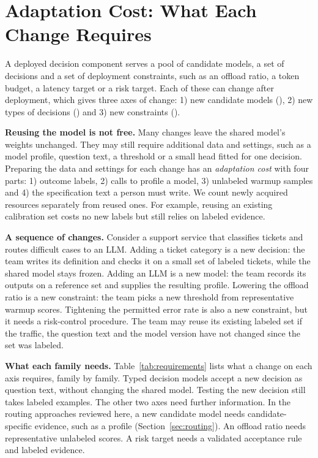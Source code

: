 \section{Adaptation Cost: What Each Change Requires}
\label{sec:adaptation}

A deployed decision component serves a pool of candidate models, a set of decisions and a set of deployment constraints, such as an offload ratio, a token budget, a latency target or a risk target. Each of these can change after deployment, which gives three axes of change: 1) new candidate models (\axisM), 2) new types of decisions (\axisD) and 3) new constraints (\axisC).

\noindent\textbf{Reusing the model is not free.} Many changes leave the shared model's weights unchanged. They may still require additional data and settings, such as a model profile, question text, a threshold or a small head fitted for one decision. Preparing the data and settings for each change has an \emph{adaptation cost} with four parts: 1) outcome labels, 2) calls to profile a model, 3) unlabeled warmup samples and 4) the specification text a person must write. We count newly acquired resources separately from reused ones. For example, reusing an existing calibration set costs no new labels but still relies on labeled evidence.

\noindent\textbf{A sequence of changes.} Consider a support service that classifies tickets and routes difficult cases to an LLM. Adding a ticket category is a new decision: the team writes its definition and checks it on a small set of labeled tickets, while the shared model stays frozen. Adding an LLM is a new model: the team records its outputs on a reference set and supplies the resulting profile. Lowering the offload ratio is a new constraint: the team picks a new threshold from representative warmup scores. Tightening the permitted error rate is also a new constraint, but it needs a risk-control procedure. The team may reuse its existing labeled set if the traffic, the question text and the model version have not changed since the set was labeled.



\noindent\textbf{What each family needs.} Table~\ref{tab:requirements} lists what a change on each axis requires, family by family. Typed decision models accept a new decision as question text, without changing the shared model. Testing the new decision still takes labeled examples. The other two axes need further information. In the routing approaches reviewed here, a new candidate model needs candidate-specific evidence, such as a profile (Section~\ref{sec:routing}). An offload ratio needs representative unlabeled scores. A risk target needs a validated acceptance rule and labeled evidence.

